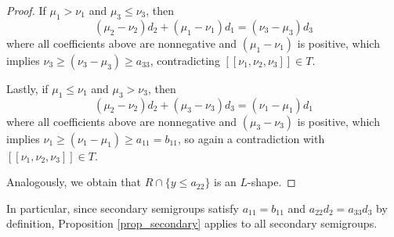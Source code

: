 \documentclass[12pt]{article}
\theoremstyle{remark}
\begin{document}
\begin{proof}
    If $\mu_1 > \nu_1$ and $\mu_3 \leq \nu_3$, then
    \begin{equation}\label{propnottrick-eq3}
         (\mu_2-\nu_2)d_2 + (\mu_1-\nu_1)d_1  =  (\nu_3-\mu_3)d_3
    \end{equation}
    where all coefficients above are nonnegative and $(\mu_1-\nu_1)$ is positive, which implies $\nu_3 \geq (\nu_3-\mu_3) \geq a_{33}$, contradicting $[[\nu_1,\nu_2,\nu_3]] \in T$.

    Lastly, if $\mu_1 \leq \nu_1$ and $\mu_3 > \nu_3$, then
    \begin{equation}\label{propnottrick-eq4}
         (\mu_2-\nu_2)d_2 + (\mu_3-\nu_3)d_3  =  (\nu_1-\mu_1)d_1
    \end{equation}
     where all coefficients above are nonnegative and $(\mu_3-\nu_3)$ is positive, which implies $\nu_1 \geq (\nu_1-\mu_1) \geq a_{11} = b_{11}$, so again a contradiction with $[[\nu_1,\nu_2,\nu_3]] \in T$.

    Analogously, we obtain that $R \cap \{y \leq a_{22}\}$ is an $L$-shape.
\end{proof}



In particular, since secondary semigroups satisfy $a_{11}=b_{11}$ and $a_{22}d_2 = a_{33}d_3$ by definition, Proposition \ref{prop_secondary} applies to all secondary semigroups.
\end{document}
